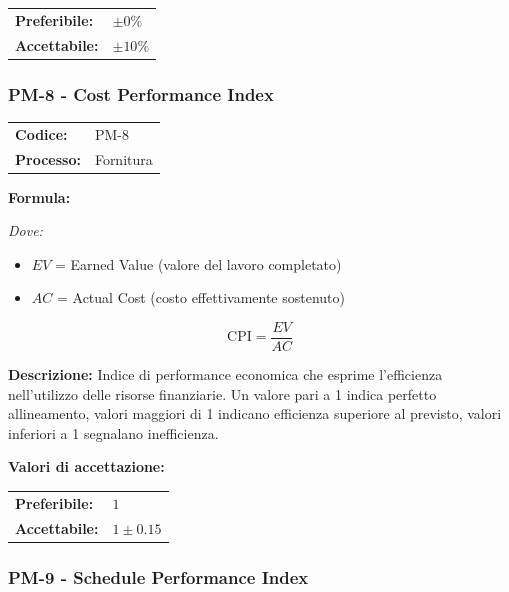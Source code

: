 \documentclass[a4paper,11pt,oneside]{scrartcl}
\begin{document}
\noindent
\begin{tabular}{@{}ll@{}}
    \textbf{Preferibile:} & $\pm 0\%$  \\
    \textbf{Accettabile:} & $\pm 10\%$ \\
\end{tabular}

\subsubsection{PM-8 - Cost Performance Index}

\noindent
\begin{tabular}{@{}p{}p{}@{}}
    \textbf{Codice:}   & PM-8      \\
    \textbf{Processo:} & Fornitura \\
\end{tabular}

\vspace{0.3cm}
\noindent\textbf{Formula:}

\noindent\textit{Dove:}
\begin{itemize}[leftmargin=1.5cm, topsep=0pt, itemsep=0pt]
    \item $EV$ = Earned Value (valore del lavoro completato)
    \item $AC$ = Actual Cost (costo effettivamente sostenuto)
\end{itemize}

\[
    \text{CPI} = \frac{EV}{AC}
\]

\noindent\textbf{Descrizione:} Indice di performance economica che esprime l'efficienza nell'utilizzo delle risorse finanziarie. Un valore pari a 1 indica perfetto allineamento, valori maggiori di 1 indicano efficienza superiore al previsto, valori inferiori a 1 segnalano inefficienza.

\vspace{0.2cm}
\noindent\textbf{Valori di accettazione:}
\vspace{0.1cm}

\noindent
\begin{tabular}{@{}ll@{}}
    \textbf{Preferibile:} & $1$          \\
    \textbf{Accettabile:} & $1 \pm 0.15$ \\
\end{tabular}

\subsubsection{PM-9 - Schedule Performance Index}
\end{document}
